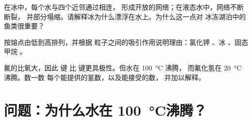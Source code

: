 \begin{exercise}[$\star\star\star$]\label{exo:g11:polarity-and-cohesion:13}
在冰中，每个水与四个近邻通过相连，
形成开放的网络；在液态水中，网络不断断裂，
并部分塌缩。请解释冰为什么漂浮在水上。为什么这一点对
冰冻湖泊中的鱼类很重要？
\end{exercise}

\begin{exercise}[$\star\star\star$]\label{exo:g11:polarity-and-cohesion:14}
按熔点由低到高排列，并根据
粒子之间的吸引作用说明理由：氯化钾 、冰
、固态甲烷 。
\end{exercise}

\begin{exercise}[$\star\star\star$]\label{exo:g11:polarity-and-cohesion:15}
氟的比氧大，因此  键
比  键更具极性。但水在 \qty{100}{\celsius} 沸腾，
而氟化氢在 \qty{20}{\celsius} 沸腾。数一数
每个能提供的氢数，以及能接受的数，
并加以解释。
\end{exercise}

\section{问题：为什么水在 \texorpdfstring{\qty{100}{\celsius}}{100 摄氏度}沸腾？}

